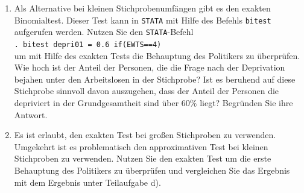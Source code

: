 \documentclass[11pt]{article}
\begin{document}
\begin{enumerate}
\begin{enumerate}
{Binomialtest für die Testentscheidung geeignet? }
\item{Als Alternative bei kleinen Stichprobenumfängen gibt es den exakten Binomialtest. Dieser Test kann in \texttt{STATA}
mit Hilfe des Befehls \texttt{bitest} aufgerufen werden. Nutzen Sie den \texttt{STATA}-Befehl \\ \texttt{. bitest depri01 = 0.6 if(EWTS==4)}\\
um mit Hilfe des exakten Tests die Behauptung des Politikers zu überprüfen. Wie hoch ist der Anteil der
Personen, die die Frage nach der Deprivation bejahen unter den Arbeitslosen in der Stichprobe? Ist es beruhend
auf diese Stichprobe sinnvoll davon auszugehen, dass der Anteil der Personen die depriviert
in der Grundgesamtheit sind über $60\%$ liegt? Begründen Sie ihre Antwort.}
\item{Es ist erlaubt, den exakten Test bei großen Stichproben zu verwenden. Umgekehrt ist es problematisch
den approximativen Test bei kleinen Stichproben zu verwenden. Nutzen Sie den exakten Test um die erste
Behauptung des Politikers zu überprüfen und vergleichen Sie das Ergebnis mit dem Ergebnis unter Teilaufgabe d).}
\end{enumerate}



\end{enumerate}
\end{document}
